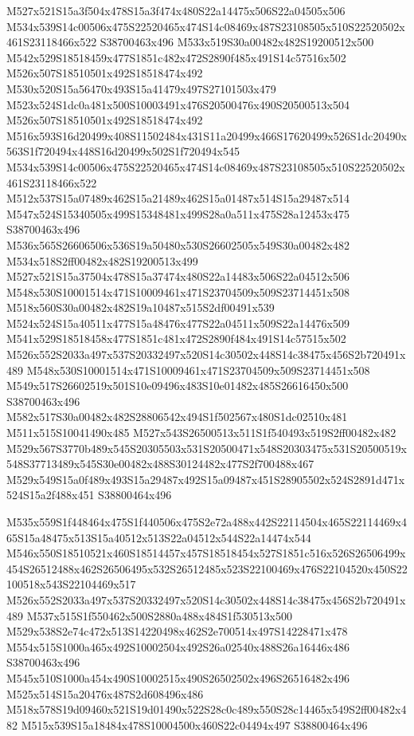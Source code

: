 \documentclass{article}
\begin{document}
\begin{multicols}{2}
M527x521S15a3f504x478S15a3f474x480S22a14475x506S22a04505x506 M534x539S14c00506x475S22520465x474S14c08469x487S23108505x510S22520502x461S23118466x522 S38700463x496 M533x519S30a00482x482S19200512x500 M542x529S18518459x477S1851c482x472S2890f485x491S14c57516x502 M526x507S18510501x492S18518474x492 M530x520S15a56470x493S15a41479x497S27101503x479 M523x524S1dc0a481x500S10003491x476S20500476x490S20500513x504 M526x507S18510501x492S18518474x492 M516x593S16d20499x408S11502484x431S11a20499x466S17620499x526S1dc20490x563S1f720494x448S16d20499x502S1f720494x545 M534x539S14c00506x475S22520465x474S14c08469x487S23108505x510S22520502x461S23118466x522 M512x537S15a07489x462S15a21489x462S15a01487x514S15a29487x514 M547x524S15340505x499S15348481x499S28a0a511x475S28a12453x475 S38700463x496 M536x565S26606506x536S19a50480x530S26602505x549S30a00482x482 M534x518S2ff00482x482S19200513x499 M527x521S15a37504x478S15a37474x480S22a14483x506S22a04512x506 M548x530S10001514x471S10009461x471S23704509x509S23714451x508 M518x560S30a00482x482S19a10487x515S2df00491x539 M524x524S15a40511x477S15a48476x477S22a04511x509S22a14476x509 M541x529S18518458x477S1851c481x472S2890f484x491S14c57515x502 M526x552S2033a497x537S20332497x520S14c30502x448S14c38475x456S2b720491x489 M548x530S10001514x471S10009461x471S23704509x509S23714451x508 M549x517S26602519x501S10e09496x483S10e01482x485S26616450x500 S38700463x496 M582x517S30a00482x482S28806542x494S1f502567x480S1dc02510x481 M511x515S10041490x485 M527x543S26500513x511S1f540493x519S2ff00482x482 M529x567S3770b489x545S20305503x531S20500471x548S20303475x531S20500519x548S37713489x545S30e00482x488S30124482x477S2f700488x467 M529x549S15a0f489x493S15a29487x492S15a09487x451S28905502x524S2891d471x524S15a2f488x451 S38800464x496

M535x559S1f448464x475S1f440506x475S2e72a488x442S22114504x465S22114469x465S15a48475x513S15a40512x513S22a04512x544S22a14474x544 M546x550S18510521x460S18514457x457S18518454x527S1851c516x526S26506499x454S26512488x462S26506495x532S26512485x523S22100469x476S22104520x450S22100518x543S22104469x517 M526x552S2033a497x537S20332497x520S14c30502x448S14c38475x456S2b720491x489 M537x515S1f550462x500S2880a488x484S1f530513x500 M529x538S2e74c472x513S14220498x462S2e700514x497S14228471x478 M554x515S1000a465x492S10002504x492S26a02540x488S26a16446x486 S38700463x496 M545x510S1000a454x490S10002515x490S26502502x496S26516482x496 M525x514S15a20476x487S2d608496x486 M518x578S19d09460x521S19d01490x522S28c0c489x550S28c14465x549S2ff00482x482 M515x539S15a18484x478S10004500x460S22c04494x497 S38800464x496


\end{multicols}
\end{document}
